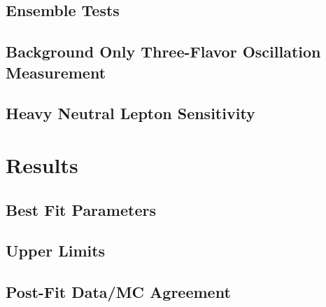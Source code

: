 \subsection{Ensemble Tests}

\subsection{Background Only Three-Flavor Oscillation Measurement}

\subsection{Heavy Neutral Lepton Sensitivity}



\section{Results}

\subsection{Best Fit Parameters}

\subsection{Upper Limits}

\subsection{Post-Fit Data/MC Agreement}
